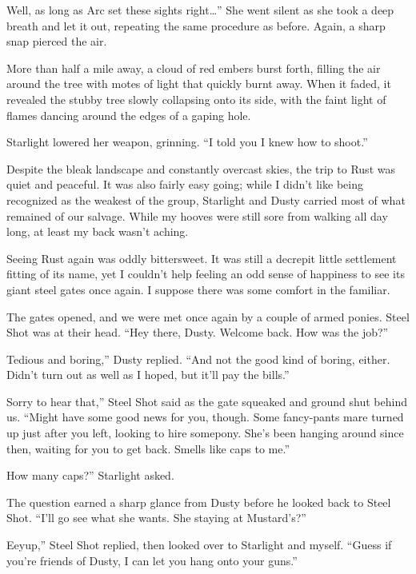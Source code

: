 \leavevmode{}Well, as long as Arc set these sights right…” She went silent as she took a deep breath and let it out, repeating the same procedure as before. Again, a sharp snap pierced the air.

More than half a mile away, a cloud of red embers burst forth, filling the air around the tree with motes of light that quickly burnt away. When it faded, it revealed the stubby tree slowly collapsing onto its side, with the faint light of flames dancing around the edges of a gaping hole.

Starlight lowered her weapon, grinning. “I told you I knew how to shoot.”

{\br}%
Despite the bleak landscape and constantly overcast skies, the trip to Rust was quiet and peaceful. It was also fairly easy going; while I didn’t like being recognized as the weakest of the group, Starlight and Dusty carried most of what remained of our salvage. While my hooves were still sore from walking all day long, at least my back wasn’t aching.

Seeing Rust again was oddly bittersweet. It was still a decrepit little settlement fitting of its name, yet I couldn’t help feeling an odd sense of happiness to see its giant steel gates once again. I suppose there was some comfort in the familiar.

The gates opened, and we were met once again by a couple of armed ponies. Steel Shot was at their head. “Hey there, Dusty. Welcome back. How was the job?”

\leavevmode{}Tedious and boring,” Dusty replied. “And not the good kind of boring, either. Didn’t turn out as well as I hoped, but it’ll pay the bills.”

\leavevmode{}Sorry to hear that,” Steel Shot said as the gate squeaked and ground shut behind us. “Might have some good news for you, though. Some fancy-pants mare turned up just after you left, looking to hire somepony. She’s been hanging around since then, waiting for you to get back. Smells like caps to me.”

\leavevmode{}How many caps?” Starlight asked.

The question earned a sharp glance from Dusty before he looked back to Steel Shot. “I’ll go see what she wants. She staying at Mustard’s?”

\leavevmode{}Eeyup,” Steel Shot replied, then looked over to Starlight and myself. “Guess if you’re friends of Dusty, I can let you hang onto your guns.”


